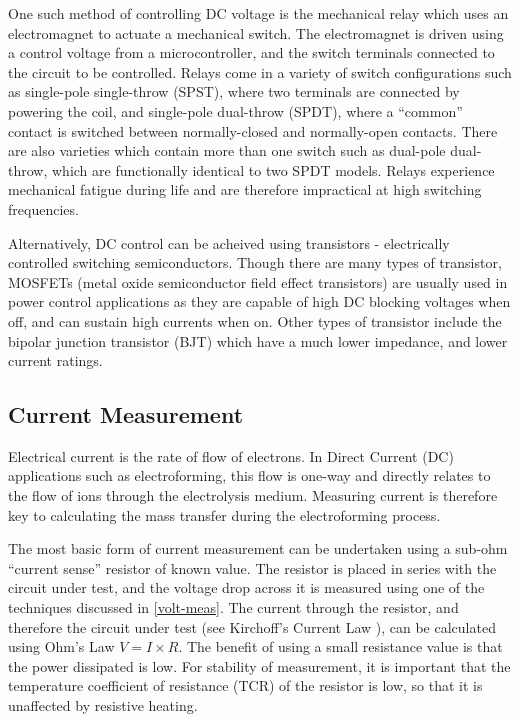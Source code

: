One such method of controlling DC voltage is the mechanical relay which uses an electromagnet to actuate a mechanical switch. The electromagnet is driven using a control voltage from a microcontroller, and the switch terminals connected to the circuit to be controlled. Relays come in a variety of switch configurations such as single-pole single-throw (SPST), where two terminals are connected by powering the coil, and single-pole dual-throw (SPDT), where a ``common'' contact is switched between normally-closed and normally-open contacts. There are also varieties which contain more than one switch such as dual-pole dual-throw, which are functionally identical to two SPDT models. Relays experience mechanical fatigue during life and are therefore impractical at high switching frequencies.

Alternatively, DC control can be acheived using transistors - electrically controlled switching semiconductors. Though there are many types of transistor, MOSFETs (metal oxide semiconductor field effect transistors) are usually used in power control applications as they are capable of high DC blocking voltages when off, and can sustain high currents when on. Other types of transistor include the bipolar junction transistor (BJT) which have a much lower impedance, and lower current ratings.

\subsection{Current Measurement}
Electrical current is the rate of flow of electrons. In Direct Current (DC) applications such as electroforming, this flow is one-way and directly relates to the flow of ions through the electrolysis medium. Measuring current is therefore key to calculating the mass transfer during the electroforming process.

The most basic form of current measurement can be undertaken using a sub-ohm ``current sense'' resistor of known value. The resistor is placed in series with the circuit under test, and the voltage drop across it is measured using one of the techniques discussed in \ref{volt-meas}. The current through the resistor, and therefore the circuit under test (see Kirchoff's Current Law \cite{kirchoff}), can be calculated using Ohm's Law \cite{ohm} $V = I \times R$. The benefit of using a small resistance value is that the power dissipated is low. For stability of measurement, it is important that the temperature coefficient of resistance (TCR) of the resistor is low, so that it is unaffected by resistive heating. 

